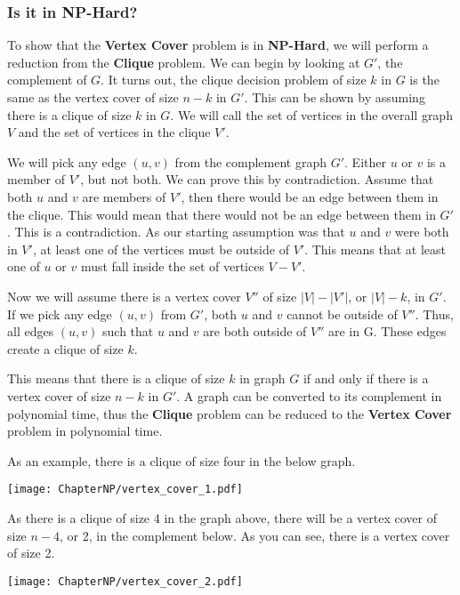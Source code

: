     \subsubsection{Is it in NP-Hard?}
        To show that the \textbf{Vertex Cover} problem is in \textbf{NP-Hard}, we will perform a reduction from the \textbf{Clique} problem. We can begin by looking at $G'$, the complement of $G$. It turns out, the clique decision problem of size $k$ in $G$ is the same as the vertex cover of size $n-k$ in $G'$. This can be shown by assuming there is a clique of size $k$ in $G$. We will call the set of vertices in the overall graph $V$ and the set of vertices in the clique $V'$.  \par
        We will pick any edge $(u,v)$ from the complement graph $G'$. Either $u$ or $v$ is a member of $V'$, but not both. We can prove this by contradiction. Assume that both $u$ and $v$ are members of $V'$, then there would be an edge between them in the clique. This would mean that there would not be an edge between them in $G'$. This is a contradiction. As our starting assumption was that $u$ and $v$ were both in $V'$, at least one of the vertices must be outside of $V'$. This means that at least one of $u$ or $v$ must fall inside the set of vertices $V - V'$. \par
        Now we will assume there is a vertex cover $V''$ of size $|V|-|V'|$, or $|V|-k$, in $G'$. If we pick any edge $(u,v)$ from $G'$, both $u$ and $v$ cannot be outside of $V''$. Thus, all edges $(u,v)$ such that $u$ and $v$ are both outside of $V''$ are in G. These edges create a clique of size $k$. \par
        This means that there is a clique of size $k$ in graph $G$ if and only if there is a vertex cover of size $n-k$ in $G'$. A graph can be converted to its complement in polynomial time, thus the \textbf{Clique} problem can be reduced to the \textbf{Vertex Cover} problem in polynomial time. \par
        As an example, there is a clique of size four in the below graph.
        \begin{center}
            \texttt{[image: ChapterNP/vertex\_cover\_1.pdf]}
        \end{center}
        As there is a clique of size 4 in the graph above, there will be a vertex cover of size $n-4$, or 2, in the complement below. As you can see, there is a vertex cover of size 2.
        \begin{center}
            \texttt{[image: ChapterNP/vertex\_cover\_2.pdf]}
        \end{center}
